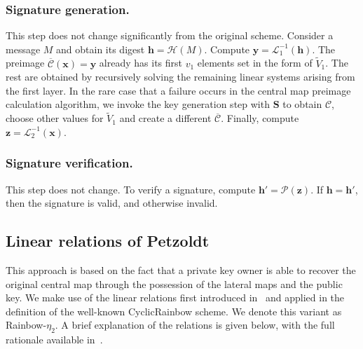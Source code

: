 \documentclass[12pt, a4paper, oneside]{memoir}
\theoremstyle{definition}
\begin{document}
\subsubsection{Signature generation.}

This step does not change significantly from the original scheme. Consider a message $M$ and obtain its digest $\mathbf{h} = \mathcal{H}(M)$. Compute $\mathbf{y} = \mathcal{L}_{1}^{-1}(\mathbf{h})$. The preimage $\overline{\mathcal{C}}(\mathbf{x}) = \mathbf{y}$ already has its first $v_{1}$ elements set in the form of $\widetilde{V}_{1}$. The rest are obtained by recursively solving the remaining linear systems arising from the first layer. In the rare case that a failure occurs in the central map preimage calculation algorithm, we invoke the key generation step with $\mathbf{S}$ to obtain $\mathcal{C}$, choose other values for $\widetilde{V}_{1}$ and create a different $\overline{\mathcal{C}}$. Finally, compute $\mathbf{z} = \mathcal{L}_{2}^{-1}(\mathbf{x})$.

\subsubsection{Signature verification.}

This step does not change. To verify a signature, compute $\mathbf{h'} = \mathcal{P}(\mathbf{z})$. If $\mathbf{h} = \mathbf{h'}$, then the signature is valid, and otherwise invalid.

\subsection{Linear relations of Petzoldt}\label{subsec:linear}

This approach is based on the fact that a private key owner is able to recover the original central map through the possession of the lateral maps and the public key. We make use of the linear relations first introduced in~\cite{Petzoldt:201006} and applied in the definition of the well-known CyclicRainbow scheme. We denote this variant as Rainbow-$\eta_{2}$. A brief explanation of the relations is given below, with the full rationale available in~\cite[Chap.~7]{Petzoldt:201307}. 
\end{document}
